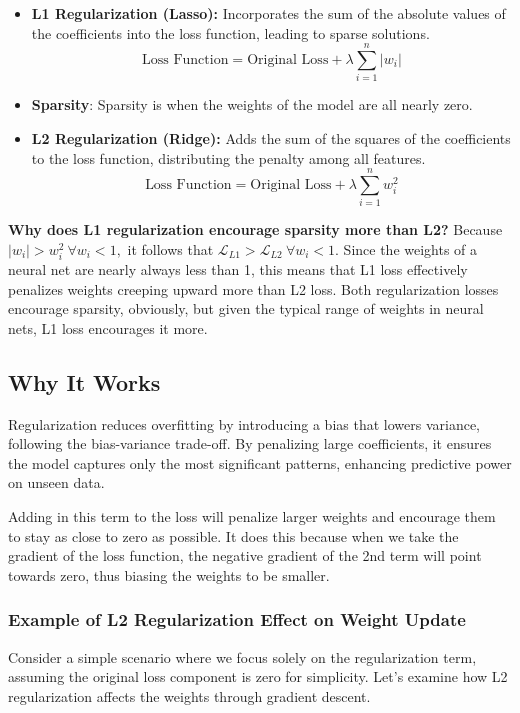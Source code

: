 \documentclass[12pt]{article}
\begin{document}
\begin{itemize}
    \item \textbf{L1 Regularization (Lasso):} Incorporates the sum of the absolute values of the coefficients into the loss function, leading to sparse solutions.
    \[ \text{Loss Function} = \text{Original Loss} + \lambda \sum_{i=1}^{n} |w_i| \]
	\item \textbf{Sparsity}: Sparsity is when the weights of the model are all nearly zero. 
    
    \item \textbf{L2 Regularization (Ridge):} Adds the sum of the squares of the coefficients to the loss function, distributing the penalty among all features.
    \[ \text{Loss Function} = \text{Original Loss} + \lambda \sum_{i=1}^{n} w_i^2 \]
\end{itemize}

\textbf{Why does L1 regularization encourage sparsity more than L2?} Because \(|w_i| > w_i^2 \ \forall w_i < 1,\) it follows that \( \mathcal{L}_{L1} > \mathcal{L}_{L2} \ \forall w_i < 1\). Since the weights of a neural net are nearly always less than 1, this means that L1 loss effectively penalizes weights creeping upward more than L2 loss. Both regularization losses encourage sparsity, obviously, but given the typical range of weights in neural nets, L1 loss encourages it more. 

\subsection{Why It Works}

Regularization reduces overfitting by introducing a bias that lowers variance, following the bias-variance trade-off. By penalizing large coefficients, it ensures the model captures only the most significant patterns, enhancing predictive power on unseen data.

Adding in this term to the loss will penalize larger weights and encourage them to stay as close to zero as possible. It does this because when we take the gradient of the loss function, the negative gradient of the 2nd term will point towards zero, thus biasing the weights to be smaller.

\subsubsection{Example of L2 Regularization Effect on Weight Update}

Consider a simple scenario where we focus solely on the regularization term, assuming the original loss component is zero for simplicity. Let's examine how L2 regularization affects the weights through gradient descent.
\end{document}
